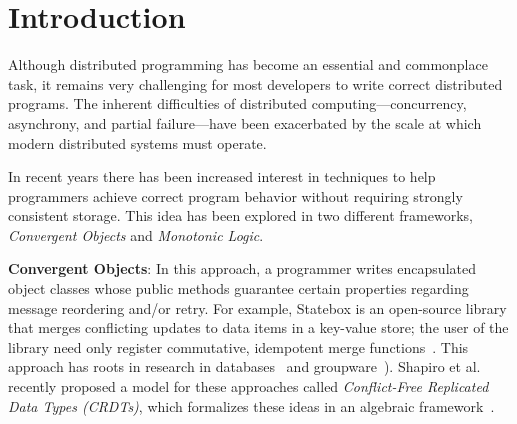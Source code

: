 \section{Introduction} \label{sec:intro} Although distributed programming has become an essential and commonplace task, it remains very challenging for most developers to write correct distributed programs. The inherent difficulties of distributed computing---concurrency, asynchrony, and partial failure---have been exacerbated by the scale at which modern distributed systems must operate.


In recent years there has been increased interest in techniques to help programmers achieve correct program behavior without requiring strongly consistent storage. This idea has been explored in two different frameworks, \emph{Convergent Objects} and \emph{Monotonic Logic}.

\vspace{0.5em}
\noindent \textbf{Convergent Objects}: In this approach, a programmer writes encapsulated object classes whose public methods guarantee certain properties regarding message reordering and/or retry. For example, Statebox is an open-source library that merges conflicting updates to data items in a key-value store; the user of the library need only register commutative, idempotent merge functions~\cite{statebox}. This approach has roots in research in databases~\cite{Garcia-Molina1983,Farrag1989,Helland2009} and groupware~\cite{operational_transformations}).  Shapiro et al. recently proposed a model for these approaches called {\em Conflict-Free Replicated Data Types (CRDTs)}, which formalizes these ideas in an algebraic framework~\cite{Shapiro2011b}. 

